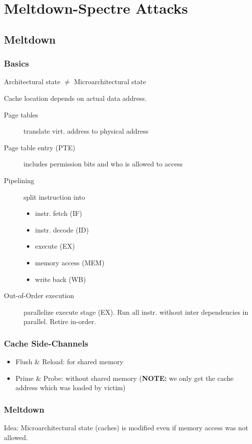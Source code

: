 \section{Meltdown-Spectre Attacks}
\subsection{Meltdown}
\subsubsection{Basics}
Architectural state $\not = $ Microarchitectural state

Cache location depends on actual data address.

\begin{description}
    \item[Page tables] translate virt. address to physical address
    \item[Page table entry (PTE)] includes permission bits and who is allowed to access
    \item[Pipelining] split instruction into
        \begin{itemize}
            \item instr. fetch (IF)
            \item instr. decode (ID)
            \item execute (EX)
            \item memory access (MEM)
            \item write back (WB)
        \end{itemize}
    \item[Out-of-Order execution] parallelize execute stage (EX). Run all instr. without inter dependencies in parallel. Retire in-order.
\end{description}

\subsubsection{Cache Side-Channels}
\begin{itemize}
    \item Flush \& Reload: for shared memory
    \item Prime \& Probe: without shared memory (\textbf{NOTE:} we only get the cache address which was loaded by victim)
\end{itemize}

\subsubsection{Meltdown}
Idea: Microarchitectural state (caches) is modified even if memory access was not allowed.

